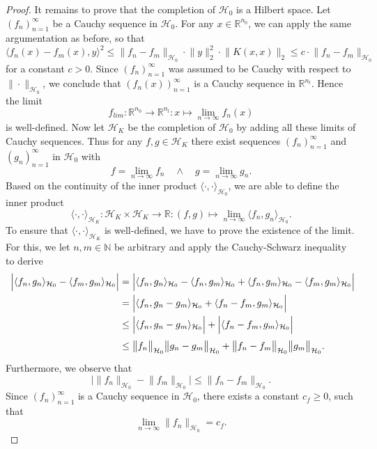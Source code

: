 \documentclass[11pt, a4paper]{article}
\newcommand{\N}{\mathbb{N}}
\newcommand{\R}{\mathbb{R}}
\renewcommand{\H}{\mathcal{H}}
\begin{document}
\begin{proof}
It remains to prove that the completion of $\H_0$ is a Hilbert space. Let $(f_n)_{n=1}^{\infty}$ be a Cauchy sequence in $\H_0$. For any $x \in \R^{n_0}$, we can apply the same argumentation as before, so that
\[ \big \langle f_n(x) -f_m(x), y \big \rangle^2 \leq \big \| f_n - f_m \big \|_{\H_0} \cdot \big \| y \big \|_2^2 \cdot \big \| K(x,x) \big \|_2 \leq c \cdot \big \| f_n - f_m \big \|_{\H_0} \]
for a constant $c > 0$. Since $(f_n)_{n=1}^{\infty}$ was assumed to be Cauchy with respect to $\| \cdot \|_{\H_0}$, we conclude that $(f_n(x))_{n=1}^{\infty}$ is a Cauchy sequence in $\R^{n_l}$. Hence the limit
\[ f_\textit{lim} : \R^{n_0} \to \R^{n_l} : x \mapsto \lim_{n \to \infty} f_n(x) \]
is well-defined. Now let $\H_K$ be the completion of $\H_0$ by adding all these limits of Cauchy sequences. Thus for any $f,g \in \H_K$ there exist sequences $(f_n)_{n=1}^{\infty}$ and $(g_n)_{n=1}^{\infty}$ in $\H_0$ with 
\[ f = \lim_{n \to \infty} f_n \quad \wedge \quad g = \lim_{n \to \infty} g_n. \]
Based on the continuity of the inner product $\langle \cdot, \cdot \rangle_{\H_0}$, we are able to define the inner product
\[ \langle \cdot, \cdot \rangle_{\H_K} : \H_K \times \H_K \to \R : (f,g) \mapsto \lim_{n \to \infty} \langle f_n, g_n \rangle_{\H_0}. \]
To ensure that $\langle \cdot, \cdot \rangle_{\H_K}$ is well-defined, we have to prove the existence of the limit. For this, we let $n, m \in \N$ be arbitrary and apply the Cauchy-Schwarz inequality to derive 
\[ \begin{split}
\Big | \langle f_n, g_n \rangle_{\H_0} - \langle f_m, g_m \rangle_{\H_0} \Big | 
&= \Big | \langle f_n, g_n \rangle_{\H_0} - \langle f_n, g_m \rangle_{\H_0} + \langle f_n, g_m \rangle_{\H_0} - \langle f_m, g_m \rangle_{\H_0} \Big | \\\
&= \Big | \langle f_n, g_n - g_m \rangle_{\H_0} + \langle f_n - f_m, g_m \rangle_{\H_0} \Big | \\\
&\leq \Big | \langle f_n, g_n - g_m \rangle_{\H_0} \Big | + \Big | \langle f_n - f_m, g_m \rangle_{\H_0} \Big | \\\
\textcolor{white}{\Big |} &\leq \big \| f_n \big \|_{\H_0} \big \| g_n - g_m \big \|_{\H_0} + \big \| f_n - f_m \big \|_{\H_0} \big \| g_m \big \|_{\H_0}.
\end{split} \]
Furthermore, we observe that
\[ \Big | \big \| f_n \big \|_{\H_0} - \big \| f_m \big \|_{\H_0} \Big | \leq \big \| f_n - f_m \big \|_{\H_0}. \]
Since $(f_n)_{n=1}^\infty$ is a Cauchy sequence in $\H_0$, there exists a constant $c_f \geq 0$, such that
\[ \lim_{n \to \infty} \| f_n \big \|_{\H_0} = c_f. \]

\end{proof}
\end{document}
